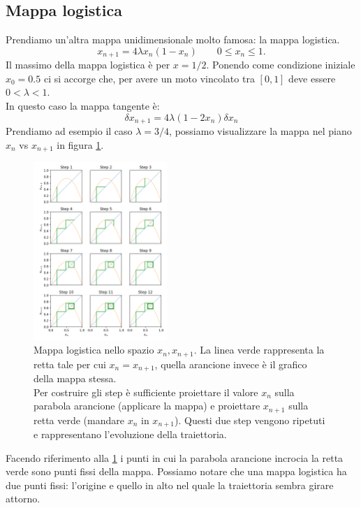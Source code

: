 \subsection{Mappa logistica}%
\label{sub:Mappa logistica}
Prendiamo un'altra mappa unidimensionale molto famosa: la mappa logistica.
\[
    x_{n+1}=4\lambda x_n (1-x_n) \qquad 0\le x_n\le 1
.\] 
Il massimo della mappa logistica è per $x = 1 /2$. Ponendo come condizione iniziale $x_0 = 0.5$ ci si accorge che, per avere un moto vincolato tra $\left[0,1\right]$ deve essere $0<\lambda <1$.\\
In questo caso la mappa tangente è:
\begin{equation}
    \delta x_{n+1} = 4\lambda(1-2x_n)\delta x_n
    \label{eq:20_tangente_log}
\end{equation}
Prendiamo ad esempio il caso $\lambda = 3 /4$, possiamo visualizzare la mappa nel piano $x_n$  vs $x_{n+1}$ in figura \ref{fig:figures-20_mappa_logistica_0-75-png}.
\begin{figure}[h]
    \centering
    \includegraphics[width=0.45\textwidth]{figures/20_mappa_logistica_0.75.png}
    \caption{\scriptsize Mappa logistica nello spazio $x_n, x_{n+1}$. La linea verde rappresenta la retta tale per cui $x_n = x_{n+1}$, quella arancione invece è il grafico della mappa stessa. \\
    Per costruire gli step è sufficiente proiettare il valore $x_n$ sulla parabola arancione (applicare la mappa) e proiettare $x_{n+1}$ sulla retta verde (mandare $x_{n}$ in $x_{n+1}$). Questi due step vengono ripetuti e rappresentano l'evoluzione della traiettoria.}
    \label{fig:figures-20_mappa_logistica_0-75-png}
\end{figure}
\noindent
Facendo riferimento alla \ref{fig:figures-20_mappa_logistica_0-75-png} i punti in cui la parabola arancione incrocia la retta verde sono punti fissi della mappa. Possiamo notare che una mappa logistica ha due punti fissi: l'origine e quello in alto nel quale la traiettoria sembra girare attorno.

